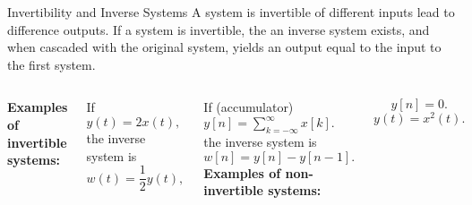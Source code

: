 \begin{frame}{Invertibility and Inverse Systems}
    A system is \alert{invertible} of different inputs lead to difference outputs. If a system is invertible, the  an \alert{inverse system} exists, and when cascaded with the original system, yields an output equal to the input to the first system.
    \vspace{0.1in}
    \par
    {
        \centering
    }
    {
        \vspace{0.5in}
    }
    \begin{columns}
        \textbf{ Examples of invertible systems:}\par
        If
        $
            y(t) = 2x(t),
        $
        the inverse system is
        \begin{equation*}
            w(t) = \frac{1}{2}y(t),
        \end{equation*}

        If (accumulator)
        $
                y[n] = \sum_{k=-\infty}^{\infty}x[k].
        $
            the inverse system is
        \begin{equation*}
            w[n] = y[n] - y[n-1].
        \end{equation*}
        \textbf{ Examples of non-invertible systems:}\par
        \begin{equation*}
            y[n] = 0.
        \end{equation*}
        \begin{equation*}
            y(t) = x^2(t).
        \end{equation*}
    \end{columns}
\end{frame}



